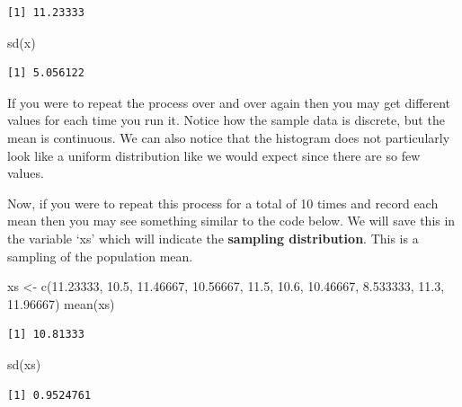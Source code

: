 \documentclass[
  letterpaper,
  DIV=11,
  numbers=noendperiod]{scrreprt}
\newenvironment{Shaded}{\begin{snugshade}}{\end{snugshade}}
\newcommand{\FloatTok}[1]{\textcolor[rgb]{0.68,0.00,0.00}{#1}}
\newcommand{\FunctionTok}[1]{\textcolor[rgb]{0.28,0.35,0.67}{#1}}
\newcommand{\NormalTok}[1]{\textcolor[rgb]{0.00,0.23,0.31}{#1}}
\newcommand{\OtherTok}[1]{\textcolor[rgb]{0.00,0.23,0.31}{#1}}
\begin{document}
\begin{verbatim}
[1] 11.23333
\end{verbatim}

\begin{Shaded}
\begin{Highlighting}[]
\FunctionTok{sd}\NormalTok{(x)}
\end{Highlighting}
\end{Shaded}

\begin{verbatim}
[1] 5.056122
\end{verbatim}

If you were to repeat the process over and over again then you may get
different values for each time you run it. Notice how the sample data is
discrete, but the mean is continuous. We can also notice that the
histogram does not particularly look like a uniform distribution like we
would expect since there are so few values.

Now, if you were to repeat this process for a total of 10 times and
record each mean then you may see something similar to the code below.
We will save this in the variable `xs' which will indicate the
\textbf{sampling distribution}. This is a sampling of the population
mean.

\begin{Shaded}
\begin{Highlighting}[]
\NormalTok{xs }\OtherTok{\textless{}{-}} \FunctionTok{c}\NormalTok{(}\FloatTok{11.23333}\NormalTok{, }\FloatTok{10.5}\NormalTok{, }\FloatTok{11.46667}\NormalTok{, }\FloatTok{10.56667}\NormalTok{, }\FloatTok{11.5}\NormalTok{, }\FloatTok{10.6}\NormalTok{,}
          \FloatTok{10.46667}\NormalTok{, }\FloatTok{8.533333}\NormalTok{, }\FloatTok{11.3}\NormalTok{, }\FloatTok{11.96667}\NormalTok{)}
\FunctionTok{mean}\NormalTok{(xs)}
\end{Highlighting}
\end{Shaded}

\begin{verbatim}
[1] 10.81333
\end{verbatim}

\begin{Shaded}
\begin{Highlighting}[]
\FunctionTok{sd}\NormalTok{(xs)}
\end{Highlighting}
\end{Shaded}

\begin{verbatim}
[1] 0.9524761
\end{verbatim}
\end{document}

